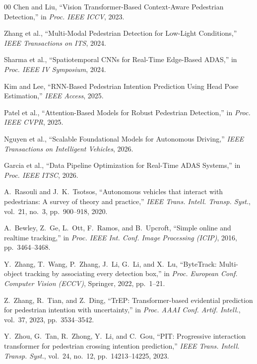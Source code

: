 \documentclass[conference]{IEEEtran}
\begin{document}
\begin{thebibliography}{00}
Chen and Liu, ``Vision Transformer-Based Context-Aware Pedestrian Detection,'' in \textit{Proc. IEEE ICCV}, 2023.

Zhang et al., ``Multi-Modal Pedestrian Detection for Low-Light Conditions,'' \textit{IEEE Transactions on ITS}, 2024.

Sharma et al., ``Spatiotemporal CNNs for Real-Time Edge-Based ADAS,'' in \textit{Proc. IEEE IV Symposium}, 2024.

Kim and Lee, ``RNN-Based Pedestrian Intention Prediction Using Head Pose Estimation,'' \textit{IEEE Access}, 2025.

Patel et al., ``Attention-Based Models for Robust Pedestrian Detection,'' in \textit{Proc. IEEE CVPR}, 2025.

Nguyen et al., ``Scalable Foundational Models for Autonomous Driving,'' \textit{IEEE Transactions on Intelligent Vehicles}, 2026.

Garcia et al., ``Data Pipeline Optimization for Real-Time ADAS Systems,'' in \textit{Proc. IEEE ITSC}, 2026.

A.~Rasouli and J.~K.~Tsotsos, ``Autonomous vehicles that interact with pedestrians: A survey of theory and practice,'' \emph{IEEE Trans. Intell. Transp. Syst.}, vol.~21, no.~3, pp.~900--918, 2020.

A.~Bewley, Z.~Ge, L.~Ott, F.~Ramos, and B.~Upcroft, ``Simple online and realtime tracking,'' in \emph{Proc. IEEE Int. Conf. Image Processing (ICIP)}, 2016, pp.~3464--3468.

Y.~Zhang, T.~Wang, P.~Zhang, J.~Li, G.~Li, and X.~Lu, ``ByteTrack: Multi-object tracking by associating every detection box,'' in \emph{Proc. European Conf. Computer Vision (ECCV)}, Springer, 2022, pp.~1--21.

Z.~Zhang, R.~Tian, and Z.~Ding, ``TrEP: Transformer-based evidential prediction for pedestrian intention with uncertainty,'' in \emph{Proc. AAAI Conf. Artif. Intell.}, vol.~37, 2023, pp.~3534--3542.

Y.~Zhou, G.~Tan, R.~Zhong, Y.~Li, and C.~Gou, ``PIT: Progressive interaction transformer for pedestrian crossing intention prediction,'' \emph{IEEE Trans. Intell. Transp. Syst.}, vol.~24, no.~12, pp.~14213--14225, 2023.


\end{thebibliography}
\end{document}
